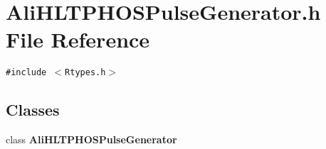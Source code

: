 \section{Ali\-HLTPHOSPulse\-Generator.h File Reference}
\label{AliHLTPHOSPulseGenerator_8h}
{\tt \#include $<$Rtypes.h$>$}\par
\subsection*{Classes}
\begin{CompactItemize}
\item 
class {\bf Ali\-HLTPHOSPulse\-Generator}
\end{CompactItemize}
